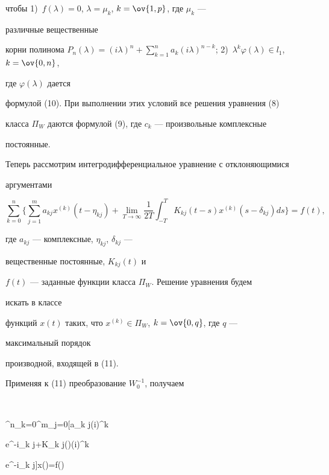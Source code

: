 чтобы 1)~$f(\lambda)=0$, $\lambda=\mu_k$, $k=\ov{1,p}$, где $\mu_k$ --- 


различные вещественные 


корни полинома $P_n(\lambda)=(i\lambda)^n+\sum\limits^n_{k=1}a_k 


(i\lambda)^{n-k}$; 2)~$\lambda^k\varphi(\lambda)\in l_1$, $k=\ov{0,n}$, 


где $\varphi(\lambda)$ дается 


формулой (10). При выполнении этих условий все решения уравнения (8) 


класса $\Pi_W$ даются формулой (9), где $c_k$ --- произвольные комплексные 


постоянные. 


 


Теперь рассмотрим интегродифференциальное уравнение с отклоняющимися  


аргументами 


\begin{equation} 


\sum^n_{k=0}\bigg\{\sum^m_{j=1}a_{k j}x^{(k)}(t-\eta_{k j}) 


+\lim_{T\to\infty}\frac{1}{2T}\int^T_{-T}K_{k j}(t-s) 


x^{(k)}(s-\delta_{k j})d s\bigg\}=f(t), 


\end{equation} 


где $a_{k j}$ --- комплексные, $\eta_{k j}$, $\delta_{k j}$ --- 


вещественные постоянные, $K_{k j}(t)$ и  


$f(t)$ --- заданные функции класса $\Pi_W$. Решение уравнения будем 


искать в классе


функций $x(t)$ таких, что $x^{(k)}\in\Pi_W$, $k=\ov{0,q}$, где $q$ --- 


максимальный порядок 


производной, входящей в (11). 


 


Применяя к (11) преобразование $W^{-1}_0$, получаем  


$$ 


\sum^n_{k=0}\sum^m_{j=0}[a_{k j}(i\lambda)^k 


e^{-i\eta_{k j}\lambda}+K_{k j}(\lambda)(i\lambda)^k 


e^{-i\delta_{k j}\lambda}]x(\lambda)=f(\lambda)


